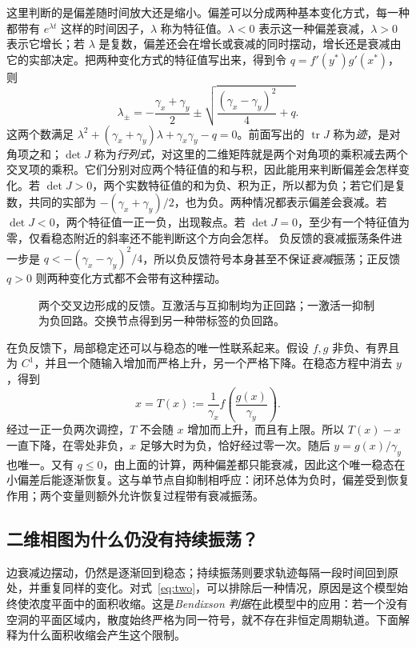 \documentclass[11pt,a4paper,UTF8,fontset=fandol]{ctexart}
\begin{document}
这里判断的是偏差随时间放大还是缩小。偏差可以分成两种基本变化方式，每一种都带有 $e^{\lambda t}$ 这样的时间因子，$\lambda$ 称为特征值。$\lambda<0$ 表示这一种偏差衰减，$\lambda>0$ 表示它增长；若 $\lambda$ 是复数，偏差还会在增长或衰减的同时摆动，增长还是衰减由它的实部决定。把两种变化方式的特征值写出来，得到令 $q=f'(y^*)g'(x^*)$，则
\[
\lambda_{\pm}=-\frac{\gamma_x+\gamma_y}{2}
\pm\sqrt{\frac{(\gamma_x-\gamma_y)^2}{4}+q}.
\]
这两个数满足 $\lambda^2+(\gamma_x+\gamma_y)\lambda+\gamma_x\gamma_y-q=0$。前面写出的 $\operatorname{tr}J$ 称为\emph{迹}，是对角项之和；$\det J$ 称为\emph{行列式}，对这里的二维矩阵就是两个对角项的乘积减去两个交叉项的乘积。它们分别对应两个特征值的和与积，因此能用来判断偏差会怎样变化。若 $\det J>0$，两个实数特征值的和为负、积为正，所以都为负；若它们是复数，共同的实部为 $-(\gamma_x+\gamma_y)/2$，也为负。两种情况都表示偏差会衰减。若 $\det J<0$，两个特征值一正一负，出现鞍点。若 $\det J=0$，至少有一个特征值为零，仅看稳态附近的斜率还不能判断这个方向会怎样。
负反馈的衰减振荡条件进一步是
$q<-(\gamma_x-\gamma_y)^2/4$，所以负反馈符号本身甚至不保证\emph{衰减}振荡；正反馈 $q>0$ 则两种变化方式都不会带有这种摆动。
\begin{figure}[H]\centering
{}
\caption{两个交叉边形成的反馈。互激活与互抑制均为正回路；一激活一抑制为负回路。交换节点得到另一种带标签的负回路。}
\end{figure}

在负反馈下，局部稳定还可以与稳态的唯一性联系起来。假设 $f,g$ 非负、有界且为 $C^1$，并且一个随输入增加而严格上升，另一个严格下降。在稳态方程中消去 $y$，得到
\[
x=T(x):=\frac1{\gamma_x}f\!\left(\frac{g(x)}{\gamma_y}\right).
\]
经过一正一负两次调控，$T$ 不会随 $x$ 增加而上升，而且有上限。所以 $T(x)-x$ 一直下降，在零处非负，$x$ 足够大时为负，恰好经过零一次。随后 $y=g(x)/\gamma_y$ 也唯一。又有 $q\leq0$，由上面的计算，两种偏差都只能衰减，因此这个唯一稳态在小偏差后能逐渐恢复。这与单节点自抑制相呼应：闭环总体为负时，偏差受到恢复作用；两个变量则额外允许恢复过程带有衰减振荡。

\subsection{二维相图为什么仍没有持续振荡？}
边衰减边摆动，仍然是逐渐回到稳态；持续振荡则要求轨迹每隔一段时间回到原处，并重复同样的变化。对式~\eqref{eq:two}，可以排除后一种情况，原因是这个模型始终使浓度平面中的面积收缩。这是\emph{Bendixson 判据}在此模型中的应用：若一个没有空洞的平面区域内，散度始终严格为同一符号，就不存在非恒定周期轨道。下面解释为什么面积收缩会产生这个限制。
\end{document}
